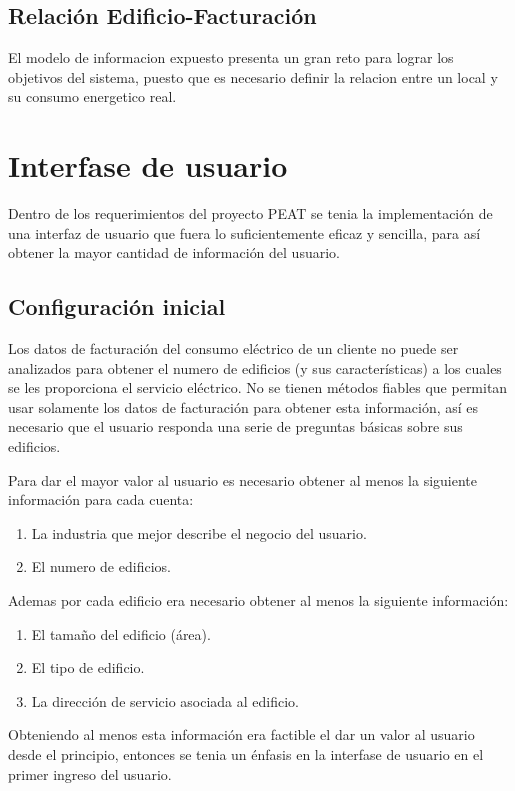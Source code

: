 \subsection{Relación Edificio-Facturación}
El modelo de informacion expuesto presenta un gran reto para lograr los objetivos del sistema,
puesto que es necesario definir la relacion entre un local y su consumo energetico real.

\section{Interfase de usuario}
Dentro de los requerimientos del proyecto PEAT se tenia la implementación de una
interfaz de usuario que fuera lo suficientemente eficaz y sencilla, para así obtener
la mayor cantidad de información del usuario.

\subsection{Configuración inicial}

Los datos de facturación del consumo eléctrico de un cliente no puede ser analizados
para obtener el numero de edificios (y sus características) a los cuales se les
proporciona el servicio eléctrico. No se tienen métodos fiables que permitan
usar solamente los datos de facturación para obtener esta información, así es
necesario que el usuario responda una serie de preguntas básicas sobre sus edificios.

Para dar el mayor valor al usuario es necesario obtener al menos la siguiente información
para cada cuenta:

\begin{enumerate}
\item La industria que mejor describe el negocio del usuario.
\item El numero de edificios.
\end{enumerate}

Ademas por cada edificio era necesario obtener al menos la siguiente información:

\begin{enumerate}
\item El tamaño del edificio (área).
\item El tipo de edificio.
\item La dirección de servicio asociada al edificio.
\end{enumerate}

Obteniendo al menos esta información era factible el dar un valor al usuario desde el
principio, entonces se tenia un énfasis en la interfase de usuario en el primer ingreso
del usuario.

